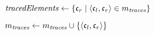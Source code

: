 \begin{algorithmic}[1]
        \algindentskip
        \State $\mathit{tracedElements} \gets \{ \mathfrak{c}_{r} \mid \langle \mathfrak{c}_{l}, \mathfrak{c}_{r} \rangle \in m_{\mathit{traces}} \}$
         \label{algo:synchronization:find_corresponding_elements:line:explicit}
                \State {}
            \EndIf
        \EndFor
        \algblockskip

         \label{algo:synchronization:find_corresponding_elements:line:implicit}
                \State $m_{\mathit{traces}} \gets m_{\mathit{traces}} \cup \{ \langle \mathfrak{c}_{l},\mathfrak{c}_{r} \rangle \}$
                \State {}
            \EndIf 
        \EndFor
        \algblockskip

        \State \Return{$\bot$}
        \algindentskip
    \EndProcedure
\end{algorithmic}